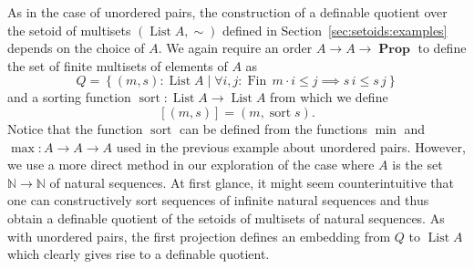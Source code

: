 \documentclass[envcountsame]{llncs}
\newcommand{\N}{\mathbb{N}}
\providecommand{\class}[1]{[#1]}
\providecommand{\set}  [1]{\left\{#1\right\}}
\DeclareMathOperator{\Prop}{\mathbf{Prop}}
\DeclareMathOperator{\List}{List}
\DeclareMathOperator{\Fin}{Fin}
\DeclareMathOperator{\sort}{sort}
\begin{document}
As in the case of unordered pairs, the construction of a definable quotient over the setoid of multisets $(\List A,\sim)$ defined in Section~\ref{sec:setoids:examples} depends on the choice of $A$.  We again require an order $A\to A \to \Prop$ to define the set of finite multisets of elements of $A$ as
\[
Q = \set{(m , s) : \List A\mid  \forall i,j:\Fin\,m \cdot i\leq j\implies s\,i \leq s\,j}
\]
and a sorting function $\sort: \List A \to \List A$ from which we define
\[
\class{(m,s)} = (m,\sort s).
\]
Notice that the function $\sort$ can be defined from the functions $\min$ and $\max : A \to A \to A$ used in the previous example about unordered pairs. However, we use a more direct method in our exploration of the case where $A$ is the set $\N\to\N$ of natural sequences. At first glance, it might seem counterintuitive that one can constructively sort sequences of infinite natural sequences and thus obtain a definable quotient of the setoids of multisets of natural sequences.
As with unordered pairs, the first projection defines an embedding from $Q$ to $\List A$ which clearly gives rise to a definable quotient. 
\end{document}
